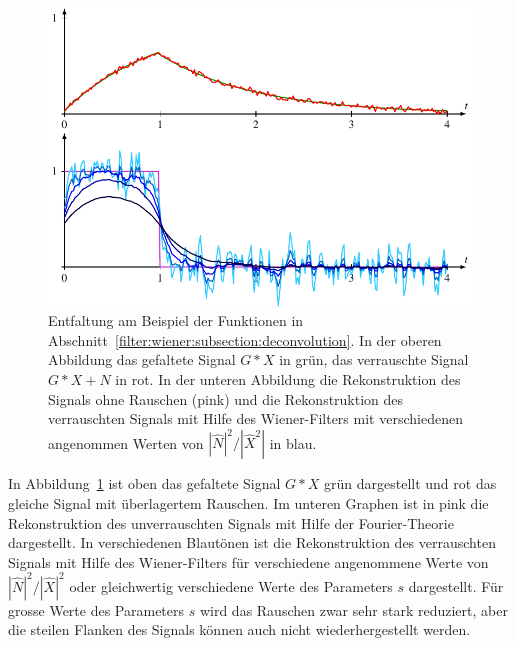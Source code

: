 \begin{figure}
\centering
\includegraphics{8-filter/images/filterung.pdf}
\caption{Entfaltung am Beispiel der Funktionen in
Abschnitt~\ref{filter:wiener:subsection:deconvolution}.
In der oberen Abbildung das gefaltete Signal $G*X$ in grün,
das verrauschte Signal $G*X+N$ in rot.
In der unteren Abbildung die Rekonstruktion des Signals ohne
Rauschen (pink) und die Rekonstruktion des verrauschten Signals
mit Hilfe des Wiener-Filters mit verschiedenen angenommen
Werten von $|\hat{N}|^2/|\hat{X}^2|$ in blau.
\label{filter:wiener:rekonstruktion}}
\end{figure}
In Abbildung~\ref{filter:wiener:rekonstruktion} ist oben das 
gefaltete Signal $G*X$ grün dargestellt und rot das gleiche Signal
mit überlagertem Rauschen.
Im unteren Graphen ist in pink die Rekonstruktion des unverrauschten
Signals mit Hilfe der Fourier-Theorie dargestellt.
In verschiedenen Blautönen ist die Rekonstruktion des verrauschten
Signals mit Hilfe des Wiener-Filters für verschiedene angenommene
Werte von $|\hat{N}|^2/|\hat{X}|^2$ oder gleichwertig verschiedene
Werte des Parameters $s$ dargestellt.
Für grosse Werte des Parameters $s$ wird das Rauschen zwar sehr stark
reduziert, aber die steilen Flanken des Signals können auch nicht
wiederhergestellt werden.

